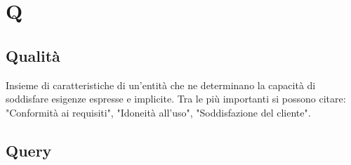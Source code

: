 \section*{Q}

\subsection{Qualità}
Insieme di caratteristiche di un'entità che ne determinano la capacità di soddisfare esigenze espresse e implicite. Tra le più importanti si possono citare: "Conformità ai requisiti", "Idoneità all'uso", "Soddisfazione del cliente".

\subsection{Query}